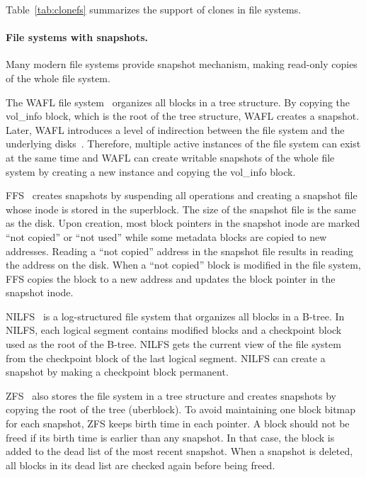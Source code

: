 Table~\ref{tab:clonefs} summarizes the support of clones in file systems.

\paragraph{File systems with snapshots.}

Many modern file systems provide snapshot mechanism, making read-only copies of
the whole file system.

The WAFL file system~\citep{wafl} organizes all blocks in a tree structure.
By copying the vol\_info block, which is the root of the tree structure, WAFL
creates a snapshot.
Later, WAFL introduces a level of indirection between the file system and the
underlying disks~\citep{wafl-flexvol}.
Therefore, multiple active instances of the file system can exist at the same
time and WAFL can create writable snapshots of the whole file system by creating
a new instance and copying the vol\_info block.

FFS~\citep{ffs1,ffs2} creates snapshots by suspending all operations and creating a
snapshot file whose inode is stored in the superblock.
The size of the snapshot file is the same as the disk.
Upon creation, most block pointers in the snapshot inode are marked
``not copied'' or ``not used'' while some metadata blocks are copied to new
addresses.
Reading a ``not copied'' address in the snapshot file results in reading the
address on the disk.
When a ``not copied'' block is modified in the file system, FFS copies the block
to a new address and updates the block pointer in the snapshot inode.

NILFS~\citep{nilfs2} is a log-structured file system that organizes all blocks
in a B-tree.
In NILFS, each logical segment contains modified blocks and a checkpoint block
used as the root of the B-tree.
NILFS gets the current view of the file system from the checkpoint block
of the last logical segment.
NILFS can create a snapshot by making a checkpoint block permanent.

ZFS~\citep{zfs} also stores the file system in a tree structure and creates
snapshots by copying the root of the tree (uberblock).
To avoid maintaining one block bitmap for each snapshot, ZFS keeps birth time
in each pointer.
A block should not be freed if its birth time is earlier than any snapshot.
In that case, the block is added to the dead list of the most recent snapshot.
When a snapshot is deleted, all blocks in its dead list are checked again before
being freed.

